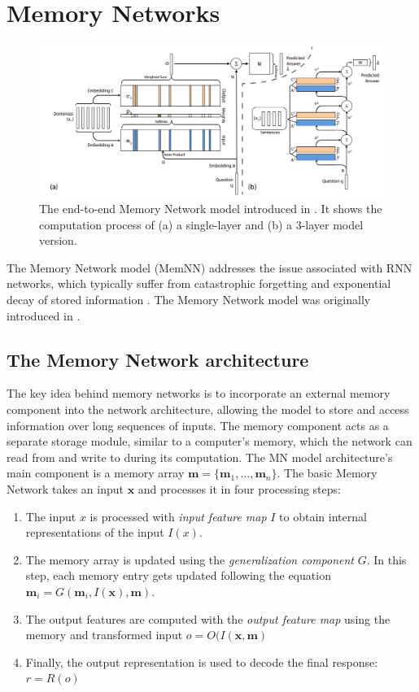 \section{Memory Networks}
\label{02:sec:mem_nn}
\begin{figure}[t]
    \centering
    \includegraphics[width=\textwidth]{images/e2e_mem_nn.png}
    \caption{The end-to-end Memory Network model introduced in \citet{sukhbaatar2015end}. It shows the computation process of (a) a single-layer and (b) a 3-layer model version. }
    \label{fig:e2e_memnn}
\end{figure}
The Memory Network model (MemNN) addresses the issue associated with RNN networks, which typically suffer from catastrophic forgetting and exponential decay of stored information \cite{neil2016phased}.
The Memory Network model was originally introduced in \citet{DBLP:journals/corr/WestonCB14}.
\subsection{The Memory Network architecture}
The key idea behind memory networks is to incorporate an external memory component into the network architecture, allowing the model to store and access information over long sequences of inputs.
The memory component acts as a separate storage module, similar to a computer's memory, which the network can read from and write to during its computation.
The MN model architecture's main component is a memory array $\mathbf{m} = \{\mathbf{m}_1,...,\mathbf{m}_n\}$.
The basic Memory Network takes an input $\mathbf{x}$ and processes it in four processing steps:
\begin{enumerate}
    \item The input $x$ is processed with \emph{input feature map} $I$ to obtain internal representations of the input $I(x)$.
    \item The memory array is updated using the \emph{generalization component} $G$. In this step, each memory entry gets updated following the equation $\mathbf{m}_i = G(\mathbf{m}_i, I(\mathbf{x}), \mathbf{m})$.
    \item The output features are computed with the \emph{output feature map} using the memory and transformed input $ o = O(I(\mathbf{x}, \mathbf{m})$
    \item Finally, the output representation is used to decode the final response: $r = R(o)$
\end{enumerate}


